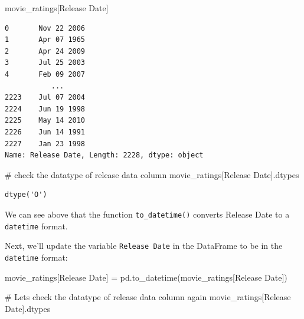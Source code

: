 \documentclass[
  letterpaper,
  DIV=11,
  numbers=noendperiod]{scrreprt}
\newenvironment{Shaded}{\begin{snugshade}}{\end{snugshade}}
\newcommand{\CommentTok}[1]{\textcolor[rgb]{0.37,0.37,0.37}{#1}}
\newcommand{\NormalTok}[1]{\textcolor[rgb]{0.00,0.23,0.31}{#1}}
\newcommand{\OperatorTok}[1]{\textcolor[rgb]{0.37,0.37,0.37}{#1}}
\newcommand{\StringTok}[1]{\textcolor[rgb]{0.13,0.47,0.30}{#1}}
\begin{document}
\begin{Shaded}
\begin{Highlighting}[]
\NormalTok{movie\_ratings[}\StringTok{\textquotesingle{}Release Date\textquotesingle{}}\NormalTok{]}
\end{Highlighting}
\end{Shaded}

\begin{verbatim}
0       Nov 22 2006
1       Apr 07 1965
2       Apr 24 2009
3       Jul 25 2003
4       Feb 09 2007
           ...     
2223    Jul 07 2004
2224    Jun 19 1998
2225    May 14 2010
2226    Jun 14 1991
2227    Jan 23 1998
Name: Release Date, Length: 2228, dtype: object
\end{verbatim}

\begin{Shaded}
\begin{Highlighting}[]
\CommentTok{\# check the datatype of release data column }
\NormalTok{movie\_ratings[}\StringTok{\textquotesingle{}Release Date\textquotesingle{}}\NormalTok{].dtypes}
\end{Highlighting}
\end{Shaded}

\begin{verbatim}
dtype('O')
\end{verbatim}

We can see above that the function \texttt{to\_datetime()} converts
Release Date to a \texttt{datetime} format.

Next, we'll update the variable \texttt{Release\ Date} in the DataFrame
to be in the \texttt{datetime} format:

\begin{Shaded}
\begin{Highlighting}[]
\NormalTok{movie\_ratings[}\StringTok{\textquotesingle{}Release Date\textquotesingle{}}\NormalTok{] }\OperatorTok{=}\NormalTok{ pd.to\_datetime(movie\_ratings[}\StringTok{\textquotesingle{}Release Date\textquotesingle{}}\NormalTok{])}
\end{Highlighting}
\end{Shaded}

\begin{Shaded}
\begin{Highlighting}[]
\CommentTok{\# Let\textquotesingle{}s check the datatype of release data column again}
\NormalTok{movie\_ratings[}\StringTok{\textquotesingle{}Release Date\textquotesingle{}}\NormalTok{].dtypes}
\end{Highlighting}
\end{Shaded}
\end{document}
